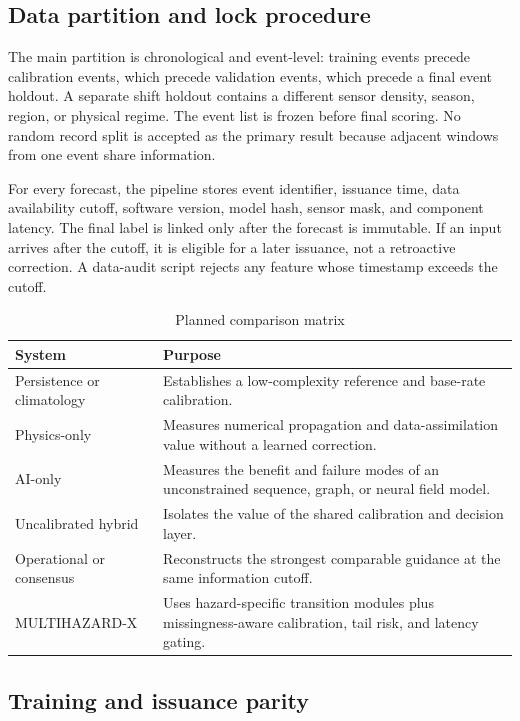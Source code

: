 \documentclass[conference]{IEEEtran}
\begin{document}
\subsection{Data partition and lock procedure}

The main partition is chronological and event-level: training events precede calibration events, which precede validation events, which precede a final event holdout. A separate shift holdout contains a different sensor density, season, region, or physical regime. The event list is frozen before final scoring. No random record split is accepted as the primary result because adjacent windows from one event share information.

For every forecast, the pipeline stores event identifier, issuance time, data availability cutoff, software version, model hash, sensor mask, and component latency. The final label is linked only after the forecast is immutable. If an input arrives after the cutoff, it is eligible for a later issuance, not a retroactive correction. A data-audit script rejects any feature whose timestamp exceeds the cutoff.

\begin{table}[t]
\caption{Planned comparison matrix}
\label{tab:baselines}
\centering
\footnotesize
\begin{tabular}{p{}p{}}
\toprule
System & Purpose\\
\midrule
Persistence or climatology & Establishes a low-complexity reference and base-rate calibration.\\
Physics-only & Measures numerical propagation and data-assimilation value without a learned correction.\\
AI-only & Measures the benefit and failure modes of an unconstrained sequence, graph, or neural field model.\\
Uncalibrated hybrid & Isolates the value of the shared calibration and decision layer.\\
Operational or consensus & Reconstructs the strongest comparable guidance at the same information cutoff.\\
MULTIHAZARD-X & Uses hazard-specific transition modules plus missingness-aware calibration, tail risk, and latency gating.\\
\bottomrule
\end{tabular}
\end{table}

\subsection{Training and issuance parity}
\end{document}
